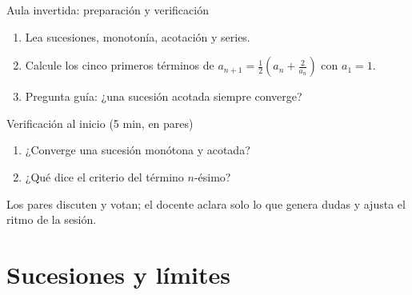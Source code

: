 \documentclass[10pt,aspectratio=169]{beamer}
\begin{document}
\begin{frame}{Aula invertida: preparación y verificación}
  \small
  \begin{previa}
    \begin{enumerate}
      \item Lea sucesiones, monotonía, acotación y series.
      \item Calcule los cinco primeros términos de $a_{n+1}=\frac12\left(a_n+\frac2{a_n}\right)$ con $a_1=1$.
      \item Pregunta guía: ¿una sucesión acotada siempre converge?
    \end{enumerate}
  \end{previa}
  \begin{block}{Verificación al inicio (5 min, en pares)}
    \begin{enumerate}
      \item ¿Converge una sucesión monótona y acotada?
      \item ¿Qué dice el criterio del término $n$-ésimo?
    \end{enumerate}
    Los pares discuten y votan; el docente aclara solo lo que genera dudas y ajusta el ritmo de la sesión.
  \end{block}
\end{frame}

\section{Sucesiones y límites}
\end{document}
